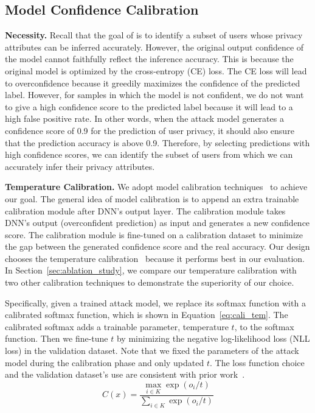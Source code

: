\subsection{Model Confidence Calibration} 

\textbf{Necessity.}
Recall that the goal of \tool is to identify a subset of users whose
privacy attributes can be inferred accurately. However, the original
output confidence of the model cannot faithfully reflect the
inference accuracy. This is because the original model is optimized by the
cross-entropy (CE) loss. The CE loss will lead to overconfidence because it greedily maximizes
the confidence of the predicted label. However, for samples in which the model
is not confident, we do not want to give a high confidence score to
the predicted label because it will lead to a high false positive rate. In other
words, when the attack model generates a confidence score of 0.9 for the
prediction of user privacy, it should also ensure that the prediction accuracy
is above 0.9. Therefore, by selecting predictions with high confidence scores,
we can identify the subset of users from which we can accurately infer their
privacy attributes.


\noindent \textbf{Temperature Calibration.}
We adopt model calibration techniques~\cite{muller2019does,wang2021rethinking}
to achieve our goal. The general idea of model calibration is to append
an extra trainable calibration module after DNN's output layer. 
The calibration module takes DNN's output (overconfident
prediction) as input and generates a new confidence score. The calibration
module is fine-tuned on a calibration dataset to minimize the gap between the
generated confidence score and the real accuracy. Our design chooses the
temperature calibration~\cite{muller2019does,wang2023tabi} because it performs best in our evaluation. In Section~\ref{sec:ablation_study}, we
compare our temperature calibration with two other calibration techniques to
demonstrate the superiority of our choice.



Specifically, given a trained attack model, we replace its softmax function with
a calibrated softmax function, which is shown in Equation~\ref{eq:cali_tem}. The
calibrated softmax adds a trainable parameter, temperature $t$, to the softmax
function. Then we fine-tune $t$ by minimizing the negative log-likelihood loss
(NLL loss) in the validation dataset. Note that we fixed the parameters of the
attack model during the calibration phase and only updated $t$. The loss function choice and the validation dataset's use are consistent
with prior work~\cite{pmlr-v80-kuleshov18a,wang2023tabi}. 
\begin{equation}
    C(x) =\frac{\max_{i \in K}\exp(o_i / t)}{\sum_{i \in K} \exp(o_i / t)}
    \label{eq:cali_tem}
\end{equation}




